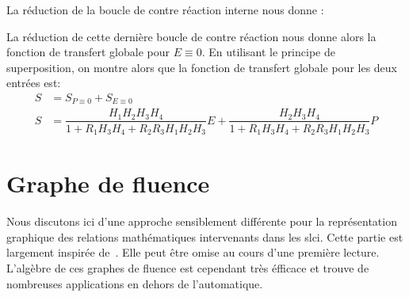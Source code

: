 La réduction de la boucle de contre réaction interne nous donne :

\begin{center}
\end{center}

La réduction de cette dernière boucle de contre réaction nous donne alors
la fonction de transfert globale pour $E\equiv0$. 
En utilisant le principe de superposition, on montre alors que la fonction 
de transfert globale pour les deux entrées est:
\begin{align*}
    S&=S_{P\equiv 0}+S_{E\equiv 0} \\
    S&=\dfrac{H_1H_2H_3H_4}{1+R_1H_3H_4+R_2R_3H_1H_2H_3} E + 
       \dfrac{H_2H_3H_4}{1+R_1H_3H_4+R_2R_3H_1H_2H_3} P 
\end{align*}


\clearpage
\section{Graphe de fluence}
Nous discutons ici d'une approche sensiblement différente 
pour la représentation graphique des relations mathématiques 
intervenants dans les \gls{slci}. Cette partie est largement
inspirée de~\cite{Ostertag}. Elle peut être omise au cours 
d'une première lecture. L'algèbre de ces graphes de fluence
est cependant très éfficace et trouve de nombreuses applications 
en dehors de l'automatique. 

